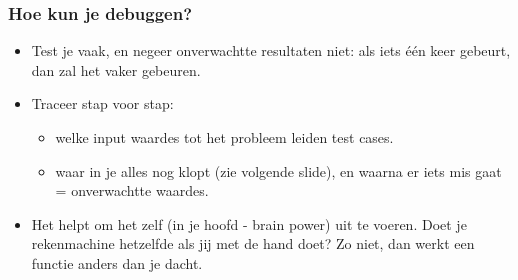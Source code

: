\begin{frame}
\frametitle{Hoe kun je debuggen?}

\begin{itemize}
  \item<1-> Test je  vaak, en negeer onverwachtte resultaten niet: als iets \'e\'en keer gebeurt, dan zal het vaker gebeuren.
  \item<2-> Traceer stap voor stap:
  \begin{itemize}
    \item<3-> welke input waardes tot het probleem leiden \tifonttxt{\>} test cases.
	\item<4-> waar in je  alles nog klopt {\tiny{(zie volgende slide)}}, en waarna er iets mis gaat = onverwachtte waardes.
  \end{itemize}
  \item<5-> Het helpt om het  zelf (in je hoofd - brain power) uit te voeren. Doet je rekenmachine hetzelfde als jij met de hand doet?
    Zo niet, dan werkt een functie anders dan je dacht.
\end{itemize}

\vspace{2cm}


\end{frame}



